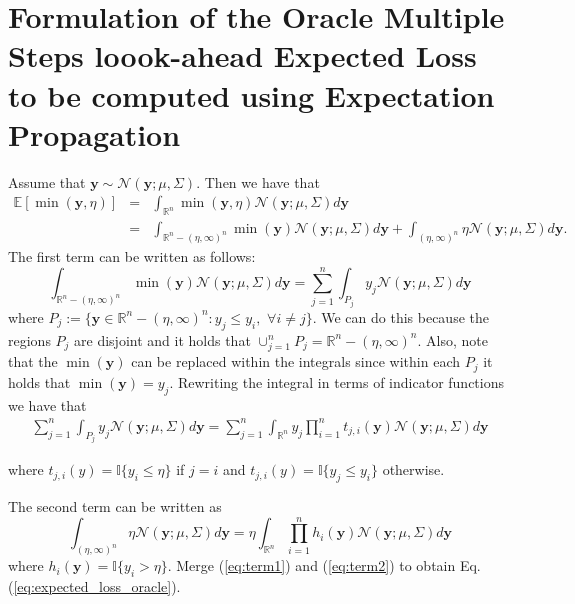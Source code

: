 \documentclass[twoside]{article}
\newcommand{\E}{\mathbb{E}}
\newcommand{\by}{\textbf{y}}
\newcommand{\N}{\mathcal{N}}
\newcommand{\IR}{\mathbb{R}}
\begin{document}
\section{Formulation of the Oracle Multiple Steps loook-ahead Expected Loss to be computed using Expectation Propagation}
Assume that $\by \sim \N(\by; \mu, \Sigma)$. Then we have that
\begin{eqnarray}\nonumber
\E[\min (\by,\eta)] & = & \int_{\IR^n} \min (\by,\eta)  \N(\by; \mu, \Sigma) d\by\\ \nonumber
& = & \int_{\IR^n - (\eta,\infty)^n } \min (\by)  \N(\by; \mu, \Sigma) d\by + \int_{(\eta,\infty)^n} \eta  \N(\by; \mu, \Sigma) d\by.  \nonumber
\end{eqnarray}
The first term can be written as follows:
\begin{equation}
 \int_{\IR^n - (\eta,\infty)^n } \min (\by)  \N(\by; \mu, \Sigma) d\by  =    \sum_{j=1}^n \int_{P_j} y_j \N(\by; \mu, \Sigma) d \by \nonumber
\end{equation}\nonumber
where $P_j := \{ \by \in\IR^n - (\eta,\infty)^n  : y_j \leq y_i,\,\, \forall i \neq j \}$. We can do this because the regions $P_j$ are disjoint and it holds that $\cup_{j=1}^{n}P_j = \IR^n - (\eta,\infty)^n $.  Also, note that the $\min(\by)$ can be replaced within the integrals since within each $P_j$ it holds that $\min(\by) = y_j$. Rewriting the integral in terms of indicator functions we have that
\begin{eqnarray}\label{eq:term1}
 \sum_{j=1}^n \int_{P_j} y_j \N(\by; \mu, \Sigma) d \by   =  \sum_{j=1}^n  \int_{\IR^n} y_j \prod_{i=1}^n t_{j,i}(\by) \N(\by; \mu, \Sigma) d \by 
\end{eqnarray}

where $t_{j,i}(y) =\mathbb{I}\{y_i \leq\eta\}$ if $j=i$ and $t_{j,i}(y) =\mathbb{I}\{y_j \leq y_i \}$ otherwise.

The second term can be written as
\begin{equation}\label{eq:term2}
 \int_{(\eta,\infty)^n } \eta  \N(\by; \mu, \Sigma) d\by = \eta\int_{\IR^n} \prod_{i=1}^nh_i(\by) \N(\by; \mu, \Sigma) d\by
\end{equation}
where $h_i(\by) = \mathbb{I}\{y_i>\eta\}$.  Merge (\ref{eq:term1}) and (\ref{eq:term2}) to obtain Eq.  (\ref{eq:expected_loss_oracle}).
 
\end{document}
